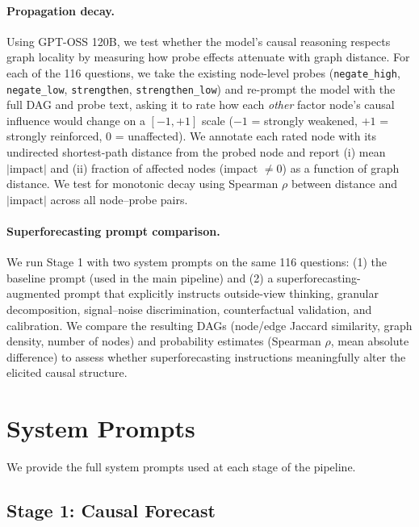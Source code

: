 \documentclass[11pt]{article}
\begin{document}
\paragraph{Propagation decay.} Using GPT-OSS 120B, we test whether the model's causal reasoning respects graph locality by measuring how probe effects attenuate with graph distance. For each of the 116 questions, we take the existing node-level probes (\texttt{negate\_high}, \texttt{negate\_low}, \texttt{strengthen}, \texttt{strengthen\_low}) and re-prompt the model with the full DAG and probe text, asking it to rate how each \emph{other} factor node's causal influence would change on a $[-1, +1]$ scale ($-1$ = strongly weakened, $+1$ = strongly reinforced, $0$ = unaffected). We annotate each rated node with its undirected shortest-path distance from the probed node and report (i) mean $|\text{impact}|$ and (ii) fraction of affected nodes (impact $\neq 0$) as a function of graph distance. We test for monotonic decay using Spearman $\rho$ between distance and $|\text{impact}|$ across all node--probe pairs.

\paragraph{Superforecasting prompt comparison.} We run Stage 1 with two system prompts on the same 116 questions: (1) the baseline prompt (used in the main pipeline) and (2) a superforecasting-augmented prompt that explicitly instructs outside-view thinking, granular decomposition, signal--noise discrimination, counterfactual validation, and calibration. We compare the resulting DAGs (node/edge Jaccard similarity, graph density, number of nodes) and probability estimates (Spearman $\rho$, mean absolute difference) to assess whether superforecasting instructions meaningfully alter the elicited causal structure.

\appendix

\section{System Prompts}
\label{app:prompts}

We provide the full system prompts used at each stage of the pipeline.

\subsection{Stage 1: Causal Forecast}
\label{app:prompt-forecast}
\end{document}
